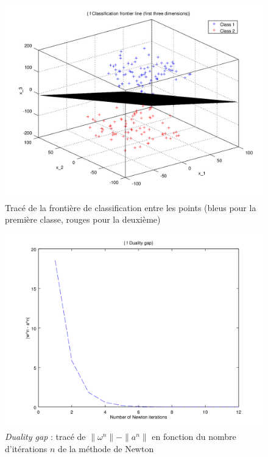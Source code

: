 \documentclass{article}
\begin{document}
         \begin{figure}
           \begin{center}
             \subfigure\includegraphics[scale=0.5]{images/plane3.png}
             \caption{Tracé de la frontière de classification entre les points (bleus pour la première classe, rouges pour la deuxième)}
           \end{center}
         \end{figure}

         \begin{figure}
           \begin{center}
             \subfigure\includegraphics[scale=0.5]{images/duality3.png}
             \caption{\emph{Duality gap} : tracé de $\|\omega^n\| - \|a^n\|$ en fonction du nombre d'itérations $n$ de la méthode de Newton}
           \end{center}
         \end{figure}
\end{document}
